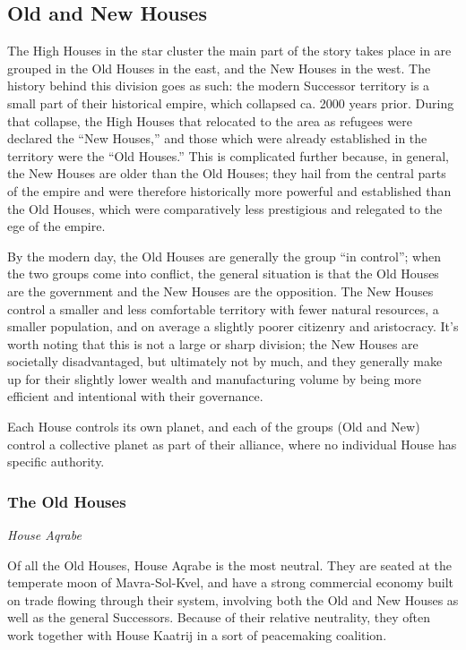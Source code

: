 \documentclass[11pt]{report}
\begin{document}
    \subsection{Old and New Houses}
    The High Houses in the star cluster the main part of the story takes place in are grouped in the Old Houses in the east, and the New Houses in the west. The history behind this division goes as such: the modern Successor territory is a small part of their historical empire, which collapsed ca. 2000 years prior. During that collapse, the High Houses that relocated to the area as refugees were declared the ``New Houses,'' and those which were already established in the territory were the ``Old Houses.'' This is complicated further because, in general, the New Houses are older than the Old Houses; they hail from the central parts of the empire and were therefore historically more powerful and established than the Old Houses, which were comparatively less prestigious and relegated to the ege of the empire.

    By the modern day, the Old Houses are generally the group ``in control''; when the two groups come into conflict, the general situation is that the Old Houses are the government and the New Houses are the opposition. The New Houses control a smaller and less comfortable territory with fewer natural resources, a smaller population, and on average a slightly poorer citizenry and aristocracy. It's worth noting that this is not a large or sharp division; the New Houses are societally disadvantaged, but ultimately not by much, and they generally make up for their slightly lower wealth and manufacturing volume by being more efficient and intentional with their governance.

    Each House controls its own planet, and each of the groups (Old and New) control a collective planet as part of their alliance, where no individual House has specific authority.


    \subsubsection{The Old Houses}

    \noindent
    \emph{House Aqrabe}

    Of all the Old Houses, House Aqrabe is the most neutral. They are seated at the temperate moon of Mavra-Sol-Kvel, and have a strong commercial economy built on trade flowing through their system, involving both the Old and New Houses as well as the general Successors. Because of their relative neutrality, they often work together with House Kaatrij in a sort of peacemaking coalition.
    \bigskip
\end{document}
